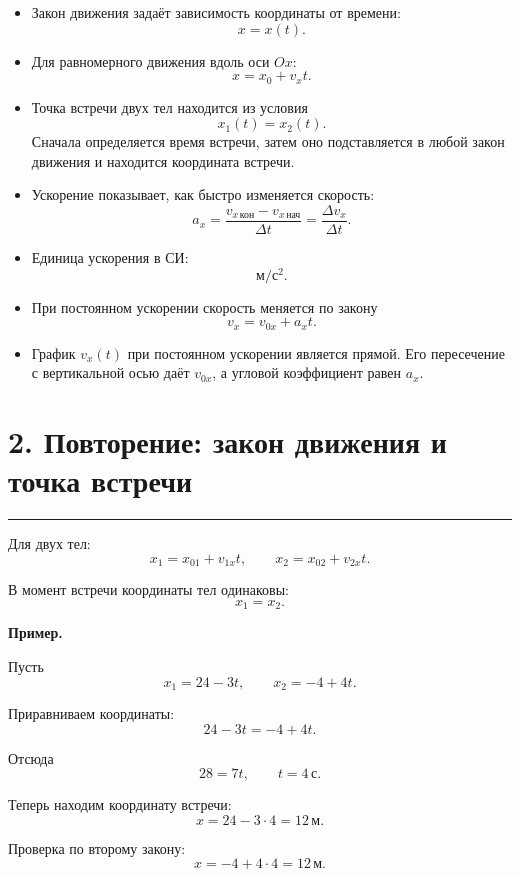 \documentclass[a4paper,12pt]{article}
\newcommand{\sectionline}{%
  \par\vspace{-0.5em}%
  \noindent\textcolor{accent}{\rule{\linewidth}{0.7pt}}%
  \par\vspace{0.5em}%
}
\newcommand{\key}[1]{\textcolor{darkaccent}{\textbf{#1}}}
\begin{document}
\begin{itemize}
  \item Закон движения задаёт зависимость координаты от времени:
  \[
    x=x(t).
  \]

  \item Для равномерного движения вдоль оси \(Ox\):
  \[
    x=x_0+v_xt.
  \]

  \item Точка встречи двух тел находится из условия
  \[
    x_1(t)=x_2(t).
  \]
  Сначала определяется время встречи, затем оно подставляется в любой закон движения и находится координата встречи.

  \item Ускорение показывает, как быстро изменяется скорость:
  \[
    a_x=
    \frac{v_{x\,\text{кон}}-v_{x\,\text{нач}}}{\Delta t}
    =
    \frac{\Delta v_x}{\Delta t}.
  \]

  \item Единица ускорения в СИ:
  \[
    \text{м}/\text{с}^2.
  \]

  \item При постоянном ускорении скорость меняется по закону
  \[
    v_x=v_{0x}+a_xt.
  \]

  \item График \(v_x(t)\) при постоянном ускорении является прямой. Его пересечение с вертикальной осью даёт \(v_{0x}\), а угловой коэффициент равен \(a_x\).
\end{itemize}


\section*{2. Повторение: закон движения и точка встречи}
\sectionline

Для двух тел:
\[
  x_1=x_{01}+v_{1x}t,
  \qquad
  x_2=x_{02}+v_{2x}t.
\]

В момент встречи координаты тел одинаковы:
\[
  x_1=x_2.
\]

\key{Пример.}

Пусть
\[
  x_1=24-3t,
  \qquad
  x_2=-4+4t.
\]

Приравниваем координаты:
\[
  24-3t=-4+4t.
\]

Отсюда
\[
  28=7t,
  \qquad
  t=4\,\text{с}.
\]

Теперь находим координату встречи:
\[
  x=24-3\cdot4=12\,\text{м}.
\]

Проверка по второму закону:
\[
  x=-4+4\cdot4=12\,\text{м}.
\]
\end{document}
